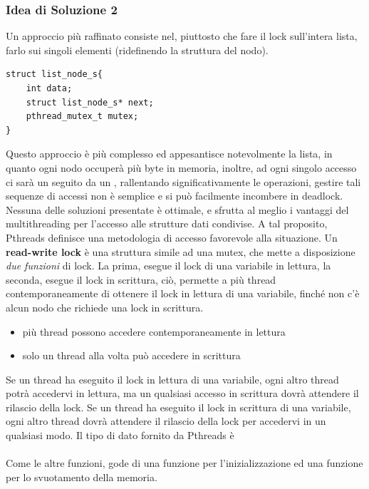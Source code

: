 \documentclass[10pt, letterpaper]{report}
\begin{document}
\subsubsection{Idea di Soluzione 2}
Un approccio più raffinato consiste nel, piuttosto che fare il lock sull'intera lista, farlo sui singoli elementi (ridefinendo la struttura del nodo).
\begin{lstlisting}[style=CStyle]
struct list_node_s{
    int data;
    struct list_node_s* next;
    pthread_mutex_t mutex;
}
\end{lstlisting}
Questo approccio è più complesso ed appesantisce notevolmente la lista, in quanto ogni nodo occuperà più byte in memoria, inoltre, ad ogni singolo accesso ci sarà un  seguito da un , rallentando significativamente le operazioni, gestire tali sequenze di accessi non è semplice e si può facilmente incombere in deadlock.\acc 
Nessuna delle soluzioni presentate è ottimale, e sfrutta al meglio i vantaggi del multithreading per l'accesso alle strutture dati condivise. A tal proposito, Pthreads definisce una metodologia di accesso favorevole alla situazione.\acc 
{} Un \textbf{read-write lock} è una struttura simile ad una mutex, che mette a disposizione \textit{due funzioni} di lock. \acc 
La prima, esegue il lock di una variabile in lettura, la seconda, esegue il lock  in scrittura, ciò, permette a più thread contemporaneamente di ottenere il lock in lettura di una variabile, finché non c'è alcun nodo che richiede una lock in scrittura.\begin{itemize}
    \item più thread possono accedere contemporaneamente in lettura
    \item solo un thread alla volta può accedere in scrittura
\end{itemize}
Se un thread ha eseguito il lock in lettura di una variabile, ogni altro thread potrà accedervi in lettura, ma un qualsiasi accesso in scrittura dovrà attendere il rilascio della lock. \acc 
Se un thread ha eseguito il lock in scrittura di una variabile,  ogni altro thread dovrà attendere il rilascio della lock per accedervi in un qualsiasi modo.\acc 
Il tipo di dato fornito da Pthreads è \\ 
\\ 
Come le altre funzioni, gode di una funzione  per l'inizializzazione ed una funzione  per lo svuotamento della memoria.
\end{document}
